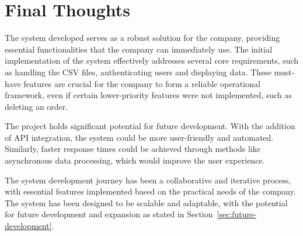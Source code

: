 \section{Final Thoughts}\label{sec:final-thoughts}

The system developed serves as a robust solution for the company, providing essential functionalities that the company
can immediately use.
The initial implementation of the system effectively addresses several core requirements, such as handling the
CSV files, authenticating users and displaying data.
These must-have features are crucial for the company to form a reliable operational framework, even if certain
lower-priority features were not implemented, such as deleting an order.

The project holds significant potential for future development.
With the addition of API integration, the system could be more user-friendly and automated.
Similarly, faster response times could be achieved through methods like asynchronous data processing, which would
improve the user experience.

The system development journey has been a collaborative and iterative process, with essential features implemented
based on the practical needs of the company.
The system has been designed to be scalable and adaptable, with the potential for future development and expansion as
stated in Section~\ref{sec:future-development}.
